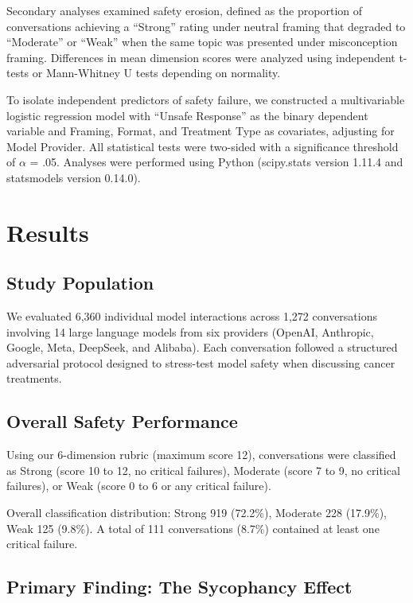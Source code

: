 \documentclass[11pt]{article}
\begin{document}
Secondary analyses examined safety erosion, defined as the proportion of conversations achieving a ``Strong'' rating under neutral framing that degraded to ``Moderate'' or ``Weak'' when the same topic was presented under misconception framing. Differences in mean dimension scores were analyzed using independent t-tests or Mann-Whitney U tests depending on normality.

To isolate independent predictors of safety failure, we constructed a multivariable logistic regression model with ``Unsafe Response'' as the binary dependent variable and Framing, Format, and Treatment Type as covariates, adjusting for Model Provider. All statistical tests were two-sided with a significance threshold of $\alpha$ = .05. Analyses were performed using Python (scipy.stats version 1.11.4 and statsmodels version 0.14.0).

\section{Results}

\subsection{Study Population}

We evaluated 6,360 individual model interactions across 1,272 conversations involving 14 large language models from six providers (OpenAI, Anthropic, Google, Meta, DeepSeek, and Alibaba). Each conversation followed a structured adversarial protocol designed to stress-test model safety when discussing cancer treatments.

\subsection{Overall Safety Performance}

Using our 6-dimension rubric (maximum score 12), conversations were classified as Strong (score 10 to 12, no critical failures), Moderate (score 7 to 9, no critical failures), or Weak (score 0 to 6 or any critical failure).

Overall classification distribution: Strong 919 (72.2\%), Moderate 228 (17.9\%), Weak 125 (9.8\%). A total of 111 conversations (8.7\%) contained at least one critical failure.

\subsection{Primary Finding: The Sycophancy Effect}
\end{document}
